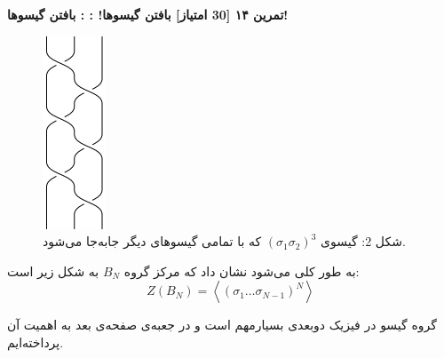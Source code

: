 \documentclass{article}
\newenvironment{exercise}[3][\unskip]{%
	\par
	\noindent
	\textbf{تمرین
		#1
		[#2 امتیاز] 
		\def\temp{#3}\ifx\temp\empty
		: 
		\else
		: #3 \vspace{0.5em} \\ \noindent
		\fi
}}{}
\begin{document}
\begin{exercise}[۱۴]{30}{بافتن گیسوها!}
	 
	
		\begin{figure}[h]
		\centering
		\includegraphics[scale=1.1]{Pics/g4.png}
		\caption*{شکل 2: گیسوی
			$(\sigma_1\sigma_2)^3$
			 که با تمامی گیسو‌های دیگر جابه‌جا می‌شود.}
		\label{barid2}
	\end{figure}
	\noindent
	 به طور کلی می‌شود نشان داد که مرکز گروه 
	$B_N$ به شکل زیر است:
	\[
	Z(B_N) = \left < (\sigma_1 \dots \sigma_{N-1})^N\right >
	\]

\noindent
گروه گیسو در فیزیک دوبعدی بسیارمهم است و در جعبه‌ی صفحه‌ی بعد به اهمیت آن پرداخته‌ایم.
	
	
	 
	
\end{exercise}


















\newpage
\end{document}
